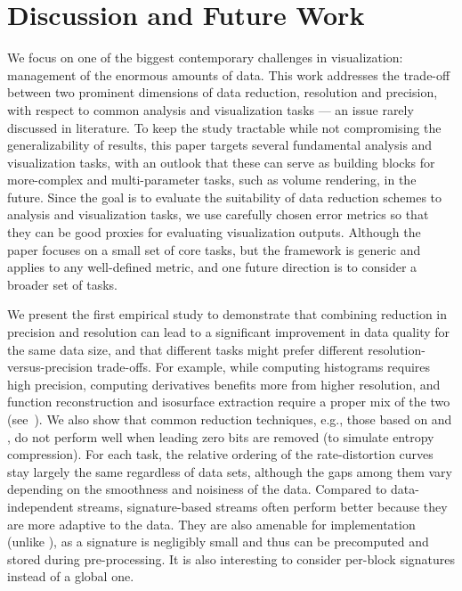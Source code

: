 \section{Discussion and Future Work}

{\color{blue}
We focus on one of the biggest contemporary challenges in visualization: management of 
the enormous amounts of data. This work addresses the trade-off between two prominent 
dimensions of data reduction, resolution and precision, with respect to 
common analysis and visualization tasks --- 
an issue rarely discussed in literature.
To keep the study tractable while not
compromising the generalizability of results, this paper targets 
several fundamental analysis and visualization tasks, with an outlook that these can serve as building blocks 
for more-complex and multi-parameter tasks, such as volume rendering, in the future.
Since the goal is to evaluate the suitability of data reduction schemes to analysis and 
visualization tasks, we use carefully chosen error metrics 
so that they can be good
proxies for evaluating visualization outputs. Although the paper focuses on a small set of core tasks, but
the framework is generic and applies to any well-defined metric, and one future direction is to
consider a broader set of tasks.}

We present the first empirical study to demonstrate that combining reduction in precision and
resolution can lead to a significant improvement in data quality for the same data size, and that
different tasks might prefer different resolution-versus-precision trade-offs. For example, while
computing histograms requires high precision, computing derivatives benefits more from higher
resolution, and function reconstruction and isosurface extraction require a proper mix of the two
(see~). We also show that common reduction techniques, e.g., those based on
\slvl and \smag, do not perform well when leading zero bits are removed (to simulate entropy
compression). {\color{red}For each task, the relative ordering of the rate-distortion curves stay
largely the same regardless of data sets, although the gaps among them vary depending on the
smoothness and noisiness of the data. Compared to data-independent streams, signature-based streams
often perform better because they are more adaptive to the data. They are also amenable for
implementation (unlike \sopt), as a signature is negligibly small and thus can be precomputed and
stored during pre-processing. It is also interesting to consider per-block signatures instead of a
global one.}

